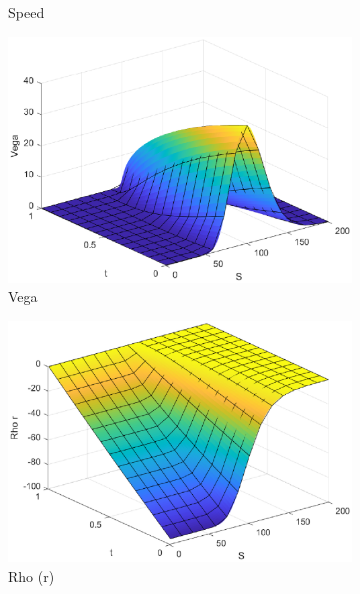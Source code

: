 \begin{figure}[H]
\begin{subfigure}[b]{0.35\linewidth}
        \caption{Speed}
    \end{subfigure}
    \begin{subfigure}[b]{0.35\linewidth}
        \includegraphics[width=\linewidth]{Imagenes/6_Sols/Put/Put_Vega.eps}
        \caption{Vega}
    \end{subfigure}
    \begin{subfigure}[b]{0.35\linewidth}
        \includegraphics[width=\linewidth]{Imagenes/6_Sols/Put/Put_Rho_r.eps}
        \caption{Rho (r)}
    \end{subfigure}
    \begin{subfigure}[b]{0.35\linewidth}

\end{subfigure}
\end{figure}
